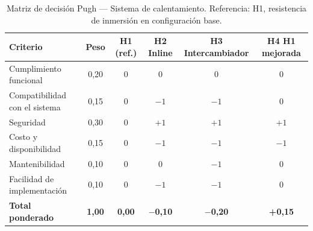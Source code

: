 \begin{table}[H]
\centering
\caption{Matriz de decisión Pugh --- Sistema de calentamiento. Referencia: H1, resistencia de inmersión en configuración base.}
\label{tab:pugh-calentamiento}
\begin{tabularx}{\textwidth}{Xccccc}
\toprule
\textbf{Criterio} & \textbf{Peso} & \textbf{H1 (ref.)} & \textbf{H2 Inline} & \textbf{H3 Intercambiador} & \textbf{H4 H1 mejorada} \\
\midrule
Cumplimiento funcional        & 0,20 & 0 & 0    & 0    & 0 \\
Compatibilidad con el sistema & 0,15 & 0 & $-1$ & $-1$ & 0 \\
Seguridad                     & 0,30 & 0 & $+1$ & $+1$ & $+1$ \\
Costo y disponibilidad        & 0,15 & 0 & $-1$ & $-1$ & $-1$ \\
Mantenibilidad                & 0,10 & 0 & 0    & $-1$ & 0 \\
Facilidad de implementación   & 0,10 & 0 & $-1$ & $-1$ & 0 \\
\midrule
\textbf{Total ponderado}      & \textbf{1,00} & \textbf{0,00} & \textbf{$-$0,10} & \textbf{$-$0,20} & \textbf{+0,15} \\
\bottomrule
\end{tabularx}
\end{table}
